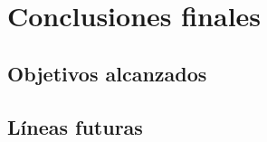 
\chapter{Conclusiones finales} %

\label{Chapter6} %


\section{Objetivos alcanzados}


\section{Líneas futuras}
